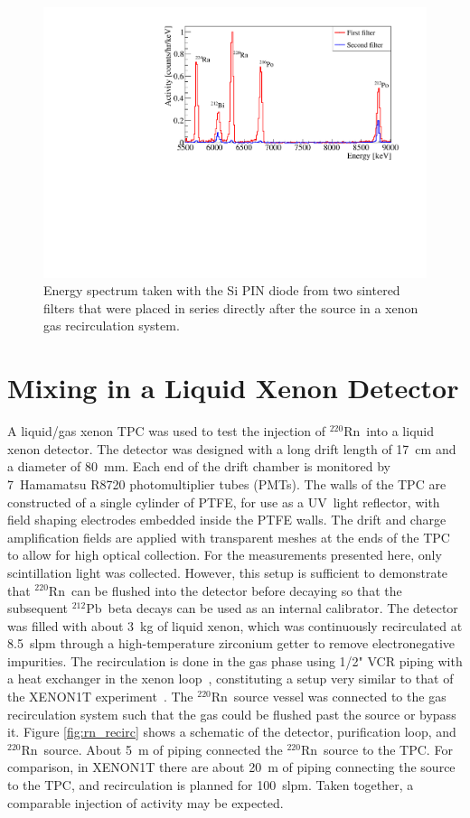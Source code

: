 \begin{figure}[htb]
\centering
    \includegraphics[trim = 5 0 40 20, clip = true,width = 0.8\columnwidth]{figures/rnsource/twofilters.pdf}
    \caption{Energy spectrum taken with the Si PIN diode from two sintered filters that were placed in series directly after the source in a xenon gas recirculation system.}\label{fig:twofilters}
\end{figure}

\section{Mixing in a Liquid Xenon Detector}

A liquid/gas xenon TPC was used to test the injection of $^{220}$Rn~into a liquid xenon detector. The detector was designed with a long drift length of 17~cm and a diameter of 80~mm. Each end of the drift chamber is monitored by 7~Hamamatsu R8720 photomultiplier tubes (PMTs). The walls of the TPC are constructed of a single cylinder of PTFE, for use as a UV~light reflector, with field shaping electrodes embedded inside the PTFE walls. The drift and charge amplification fields are applied with transparent meshes at the ends of the TPC to allow for high optical collection. For the measurements presented here, only scintillation light was collected. However, this setup is sufficient to demonstrate that $^{220}$Rn~can be flushed into the detector before decaying so that the subsequent $^{212}$Pb~beta decays can be used as an internal calibrator. The detector was filled with about 3~kg of liquid xenon, which was continuously recirculated at 8.5~slpm through a high-temperature zirconium getter to remove electronegative impurities. The recirculation is done in the gas phase using 1/2" VCR piping with a heat exchanger in the xenon loop~\cite{Giboni:2011wx}, constituting a setup very similar to that of the XENON1T experiment~\cite{Aprile:2012jh}. The $^{220}$Rn~source vessel was connected to the gas recirculation system such that the gas could be flushed past the source or bypass it. Figure \ref{fig:rn_recirc} shows a schematic of the detector, purification loop, and $^{220}$Rn~source. About 5~m of piping connected the $^{220}$Rn~source to the TPC. For comparison, in XENON1T there are about 20~m of piping connecting the source to the TPC, and recirculation is planned for 100~slpm. Taken together, a comparable injection of activity may be expected.

